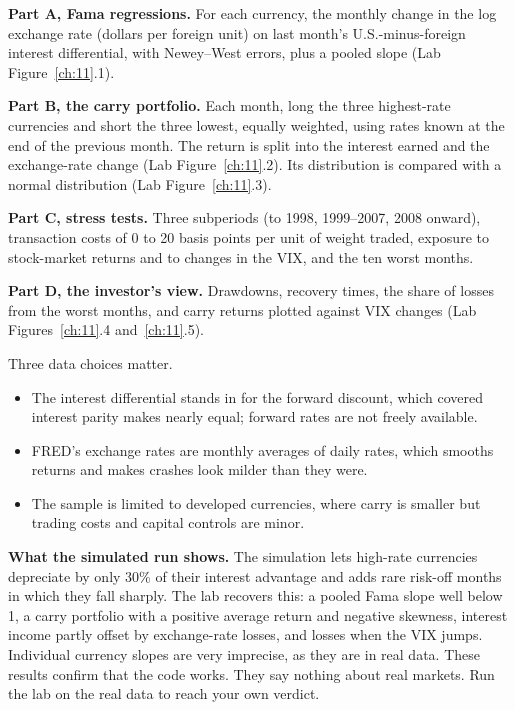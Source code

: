 \textbf{Part A, Fama regressions.} For each currency, the monthly change in the log exchange rate (dollars per foreign unit) on last month's U.S.-minus-foreign interest differential, with Newey--West errors, plus a pooled slope (Lab Figure~\ref{ch:11}.1).

\textbf{Part B, the carry portfolio.} Each month, long the three highest-rate currencies and short the three lowest, equally weighted, using rates known at the end of the previous month. The return is split into the interest earned and the exchange-rate change (Lab Figure~\ref{ch:11}.2). Its distribution is compared with a normal distribution (Lab Figure~\ref{ch:11}.3).

\textbf{Part C, stress tests.} Three subperiods (to 1998, 1999--2007, 2008 onward), transaction costs of 0 to 20 basis points per unit of weight traded, exposure to stock-market returns and to changes in the VIX, and the ten worst months.

\textbf{Part D, the investor's view.} Drawdowns, recovery times, the share of losses from the worst months, and carry returns plotted against VIX changes (Lab Figures~\ref{ch:11}.4 and~\ref{ch:11}.5).

Three data choices matter.

\begin{itemize}
  \item The interest differential stands in for the forward discount, which covered interest parity makes nearly equal; forward rates are not freely available.
  \item FRED's exchange rates are monthly averages of daily rates, which smooths returns and makes crashes look milder than they were.
  \item The sample is limited to developed currencies, where carry is smaller but trading costs and capital controls are minor.
\end{itemize}

\textbf{What the simulated run shows.} The simulation lets high-rate currencies depreciate by only 30\% of their interest advantage and adds rare risk-off months in which they fall sharply. The lab recovers this: a pooled Fama slope well below 1, a carry portfolio with a positive average return and negative skewness, interest income partly offset by exchange-rate losses, and losses when the VIX jumps. Individual currency slopes are very imprecise, as they are in real data. These results confirm that the code works. They say nothing about real markets. Run the lab on the real data to reach your own verdict.

